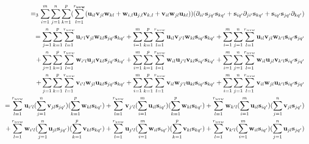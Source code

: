 \documentclass{article}
\begin{document}
\begin{eqnarray*}
    \lefteqn{}
    & & =_3 \sum_{i=1}^m\sum_{j=1}^n\sum_{k=1}^p(\sum_{l=1}^{r_\mathbf{uvw}}(\mathbf{u}_{il}\mathbf{v}_{jl}\mathbf{w}_{kl} + \mathbf{w}_{i,l}\mathbf{u}_{j,l}\mathbf{v}_{k,l} + \mathbf{v}_{il}\mathbf{w}_{jl}\mathbf{u}_{kl}))(\partial_{ii'} \mathbf{s}_{jq'}\mathbf{s}_{kq'} + \mathbf{s}_{iq'}\partial_{ji'} \mathbf{s}_{kq'} + \mathbf{s}_{iq'}\mathbf{s}_{jq'}\partial_{kq'}) \\
    & & = \sum_{j=1}^n\sum_{k=1}^p\sum_{l=1}^{r_{uvw}}\mathbf{u}_{i'l}\mathbf{v}_{jl}\mathbf{w}_{kl}\mathbf{s}_{jq'}\mathbf{s}_{kq'} + \sum_{i=1}^m\sum_{k=1}^p\sum_{l=1}^{r_{uvw}}\mathbf{u}_{il}\mathbf{v}_{j'l}\mathbf{w}_{kl}\mathbf{s}_{iq'}\mathbf{s}_{kq'} + \sum_{i=1}^m\sum_{j=1}^n\sum_{l=1}^{r_{uvw}}\mathbf{u}_{il}\mathbf{v}_{jl}\mathbf{w}_{k'l}\mathbf{s}_{iq'}\mathbf{s}_{jq'} \\
    & & + \sum_{j=1}^n\sum_{k=1}^p\sum_{l=1}^{r_{uvw}}\mathbf{w}_{i'l}\mathbf{u}_{jl}\mathbf{v}_{kl}\mathbf{s}_{jq'}\mathbf{s}_{kq'} + \sum_{i=1}^m\sum_{k=1}^p\sum_{l=1}^{r_{uvw}}\mathbf{w}_{il}\mathbf{u}_{j'l}\mathbf{v}_{kl}\mathbf{s}_{iq'}\mathbf{s}_{kq'} + \sum_{i=1}^m\sum_{j=1}^n\sum_{l=1}^{r_{uvw}}\mathbf{w}_{il}\mathbf{u}_{jl}\mathbf{v}_{k'l}\mathbf{s}_{iq'}\mathbf{s}_{jq'} \\
    & & + \sum_{j=1}^n\sum_{k=1}^p\sum_{l=1}^{r_{uvw}}\mathbf{v}_{i'l}\mathbf{w}_{jl}\mathbf{u}_{kl}\mathbf{s}_{jq'}\mathbf{s}_{kq'} + \sum_{i=1}^m\sum_{k=1}^p\sum_{l=1}^{r_{uvw}}\mathbf{v}_{il}\mathbf{w}_{j'l}\mathbf{u}_{kl}\mathbf{s}_{iq'}\mathbf{s}_{kq'} + \sum_{i=1}^m\sum_{j=1}^n\sum_{l=1}^{r_{uvw}}\mathbf{v}_{il}\mathbf{w}_{jl}\mathbf{u}_{k'l}\mathbf{s}_{iq'}\mathbf{s}_{jq'} \\
    & & = \sum_{l=1}^{r_{uvw}}\mathbf{u}_{i'l}(\sum_{j=1}^n\mathbf{v}_{jl}\mathbf{s}_{jq'})(\sum_{k=1}^p\mathbf{w}_{kl}\mathbf{s}_{kq'}) + \sum_{l=1}^{r_{uvw}}\mathbf{v}_{j'l}(\sum_{i=1}^m\mathbf{u}_{il}\mathbf{s}_{iq'})(\sum_{k=1}^p\mathbf{w}_{kl}\mathbf{s}_{kq'}) + \sum_{l=1}^{r_{uvw}}\mathbf{w}_{k'l}(\sum_{i=1}^m\mathbf{u}_{il}\mathbf{s}_{iq'})(\sum_{j=1}^n\mathbf{v}_{jl}\mathbf{s}_{jq'}) \\
    & & + \sum_{l=1}^{r_{uvw}}\mathbf{w}_{i'l}(\sum_{j=1}^n\mathbf{u}_{jl}\mathbf{s}_{jq'})(\sum_{k=1}^p\mathbf{v}_{kl}\mathbf{s}_{kq'}) + \sum_{l=1}^{r_{uvw}}\mathbf{u}_{j'l}(\sum_{i=1}^m\mathbf{w}_{il}\mathbf{s}_{iq'})(\sum_{k=1}^p\mathbf{v}_{kl}\mathbf{s}_{kq'}) + \sum_{l=1}^{r_{uvw}}\mathbf{v}_{k'l}(\sum_{i=1}^m\mathbf{w}_{il}\mathbf{s}_{iq'})(\sum_{j=1}^n\mathbf{u}_{jl}\mathbf{s}_{jq'})
\end{eqnarray*}
\end{document}
